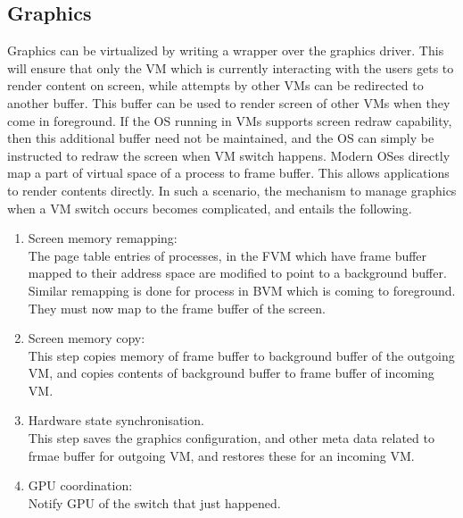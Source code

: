 \documentclass[seminar,twoside]{iitbreport}
\begin{document}
 \subsection*{Graphics} 
 Graphics can be virtualized by writing a wrapper over the graphics driver. This will ensure that only the VM which is currently interacting with the users gets to render content
 on screen, while attempts by other VMs can be redirected to another buffer. This buffer can be used to render screen of other VMs when they come in foreground. If the OS
 running in VMs supports screen redraw capability, then this additional buffer need not be maintained, and the OS can simply be instructed to redraw the screen when VM switch
 happens. Modern OSes directly map a part of virtual space of a process to frame buffer. This allows applications to render contents directly. In such a scenario, the mechanism
 to manage graphics when a VM switch occurs becomes complicated, and entails the following.
 \begin{enumerate}
 \renewcommand{\labelenumi}{(\roman{enumi})}
  \item Screen memory remapping: \\
  The page table entries of processes, in the FVM which have frame buffer mapped to their address space are modified to point to a background buffer. Similar remapping
  is done for process in BVM which is coming to foreground. They must now map to the frame buffer of the screen.
  \item Screen memory copy:\\
  This step copies memory of frame buffer to background buffer of the outgoing VM, and copies contents of background buffer to frame buffer of incoming VM.
  \item Hardware state synchronisation.\\
  This step saves the graphics configuration, and other meta data related to frmae buffer for outgoing VM, and restores these for an incoming VM.
  \item GPU coordination: \\
  Notify GPU of the switch that just happened.
 \end{enumerate}
\newpage
\end{document}
